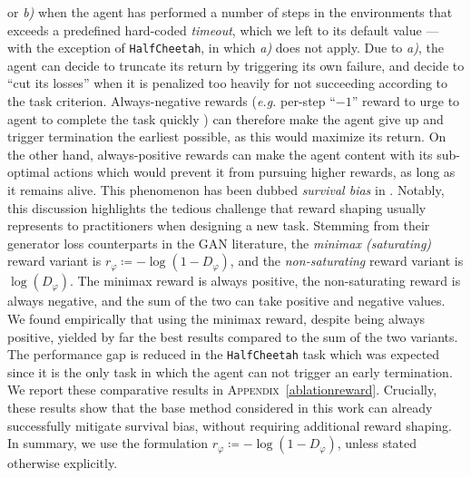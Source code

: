 or \textit{b)} when the agent has performed a number of steps in the
environments that exceeds a predefined hard-coded \emph{timeout},
which we left to its default value
--- with the exception of \texttt{HalfCheetah}, in which \textit{a)} does not apply.
Due to \textit{a)}, the agent can decide to truncate its return by triggering its own
failure, and decide to ``cut its losses'' when it is penalized too heavily for not succeeding
according to the task criterion.
Always-negative rewards (\textit{e.g.} per-step ``$-1$'' reward
to urge to agent to complete the task quickly \cite{Kaelbling1993-dv})
can therefore make the agent give up and trigger termination the earliest possible,
as this would maximize its return.
On the other hand, always-positive rewards can make the agent content with its
sub-optimal actions which would prevent it from pursuing higher rewards,
as long as it remains alive.
This phenomenon has been dubbed \textit{survival bias} in \cite{Kostrikov2019-jo}.
Notably, this discussion highlights the tedious challenge
that reward shaping \cite{Ng1999-lv} usually represents to practitioners
when designing a new task.
Stemming from their generator loss counterparts in the GAN literature,
the \emph{minimax (saturating)} reward variant is $r_\varphi \coloneqq -\log(1-D_\varphi)$,
and the \emph{non-saturating} reward variant is $\log(D_\varphi)$.
The minimax reward is always positive, the non-saturating reward is always negative,
and the sum of the two can take positive and negative values.
We found empirically that using the minimax reward, despite being always positive,
yielded by far the best results compared to the sum of the two variants.
The performance gap is reduced in the \texttt{HalfCheetah} task which was expected
since it is the only task in which the agent can not trigger an early termination.
We report these comparative results in \textsc{Appendix}~\ref{ablationreward}.
Crucially, these results show that the base method considered in this work
can already successfully mitigate survival bias, without requiring
additional reward shaping.
In summary, we use the formulation $r_\varphi \coloneqq - \log(1 - D_\varphi)$,
unless stated otherwise explicitly.

